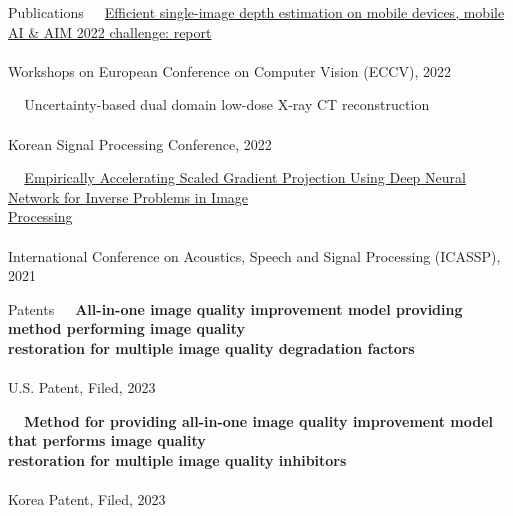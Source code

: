 \documentclass{resume} %
\newcommand{\mycolor}[1]{\textcolor{myurlcolor}{#1}}
\begin{document}
\begin{rSection}{Publications}
\textbullet~\,\, \href{https://link.springer.com/chapter/10.1007/978-3-031-25066-8_4}{Efficient single-image depth estimation on mobile devices, mobile AI \& AIM 2022 challenge: report}
\\ 
\\ \hspace*{1.5em}Workshops on European Conference on Computer Vision (ECCV), 2022





\textbullet~\,\, {\mycolor{Uncertainty-based dual domain low-dose X-ray CT reconstruction}}
\\ 
\\ \hspace*{1.5em}Korean Signal Processing Conference, 2022

\textbullet~\,\, \href{https://ieeexplore.ieee.org/document/9415023}{Empirically Accelerating Scaled Gradient Projection Using Deep Neural Network for Inverse Problems in Image \\ \hspace*{1.5em}Processing}
\\ 
\\ \hspace*{1.5em}International Conference on Acoustics, Speech and Signal Processing (ICASSP), 2021 \\
\end{rSection} 





\begin{rSection}{Patents}
\textbullet~\,\, \textbf{All-in-one image quality improvement model providing method performing image quality \\\hspace*{1.4em}restoration for multiple image quality degradation factors}
\\ 
\\ \hspace*{1.5em}U.S. Patent, Filed, 2023


\textbullet~\,\, \textbf{Method for providing all-in-one image quality improvement model that performs image quality \\\hspace*{1.4em}restoration for multiple image quality inhibitors}
\\ 
\\ \hspace*{1.5em}Korea Patent, Filed, 2023 \\
\end{rSection}
\end{document}
